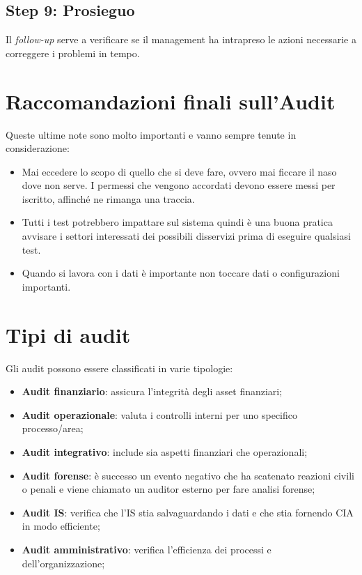 \subsection{Step 9: Prosieguo}


Il \textit{follow-up} serve a verificare se il management ha intrapreso le azioni
necessarie a correggere i problemi in tempo.

\section{Raccomandazioni finali sull'Audit}

Queste ultime note sono molto importanti e vanno sempre tenute in
considerazione:
\begin{itemize}
\item Mai eccedere lo scopo di quello che si deve fare, ovvero mai ficcare il
naso dove non serve. I permessi che vengono accordati devono essere messi per
iscritto, affinché ne rimanga una traccia.
\item Tutti i test potrebbero impattare sul sistema quindi è una buona
pratica avvisare i settori interessati dei possibili disservizi prima di eseguire
qualsiasi test.
\item Quando si lavora con i dati è importante non toccare dati o configurazioni
importanti.
\end{itemize}


\section{Tipi di audit}

Gli audit possono essere classificati in varie tipologie:
\begin{itemize}
\item \textbf{Audit finanziario}: assicura l'integrità degli asset 
finanziari;
\item \textbf{Audit operazionale}: valuta i controlli interni per uno 
specifico processo/area;
\item \textbf{Audit integrativo}: include sia aspetti finanziari
che operazionali;
\item \textbf{Audit forense}: è successo un evento negativo che ha 
scatenato reazioni civili o penali e viene chiamato un auditor
esterno per fare analisi forense;
\item \textbf{Audit IS}: verifica che l'IS stia salvaguardando i dati
e che stia fornendo CIA in modo efficiente;
\item \textbf{Audit amministrativo}: verifica l'efficienza dei processi
e dell'organizzazione;
\end{itemize}


